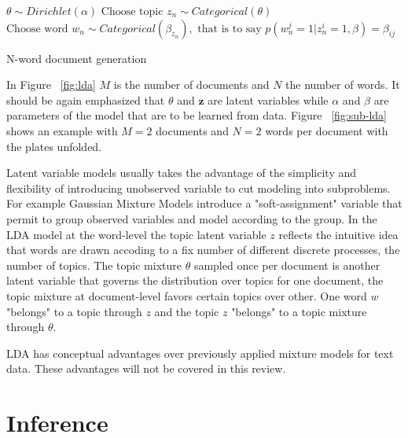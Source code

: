 \documentclass[12pt,a4paper,onecolumn]{article}
\begin{document}
\begin{algorithm}
	\begin{algorithmic}
		\State $\theta \sim Dirichlet(\alpha)$
		\State $\text{Choose topic } z_n \sim Categorical(\theta)$
		\State $\text{Choose word }w_n \sim Categorical(\beta_{z_n}), \text{ that is to say }p(w_n^j=1|z_n^i=1,\beta)=\beta_{ij}$
		\EndFor
	\end{algorithmic}
	\caption{N-word document generation}
	\label{alg:doc}
\end{algorithm}


{
}{}{}


In Figure ~\ref{fig:lda} $M$ is the number of documents and $N$ the number of words. It should be again emphasized that $\theta$ and $\mathbf{z}$ are latent variables while $\alpha$ and $\beta$ are parameters of the model that are to be learned from data. Figure ~\ref{fig:sub-lda} shows an example with $M=2$ documents and $N=2$ words per document with the plates unfolded.

Latent variable models usually takes the advantage of the simplicity and flexibility of introducing unobserved variable to cut modeling into subproblems. For example Gaussian Mixture Models introduce a "soft-assignment" variable that permit to group observed variables and model according to the group. In the LDA model at the word-level the topic latent variable $z$ reflects the intuitive idea that words are drawn accoding to a fix number of different discrete processes, the number of topics. The topic mixture $\theta$ sampled once per document is another latent variable that governs the distribution over topics for one document, the topic mixture at document-level favors certain topics over other. One word $w$ "belongs" to a topic through $z$ and the topic $z$ "belongs" to a topic mixture through $\theta$.

LDA has conceptual advantages over previously applied mixture models for text data. These advantages will not be covered in this review.


\section{Inference}
\label{sec:inference}
\end{document}
